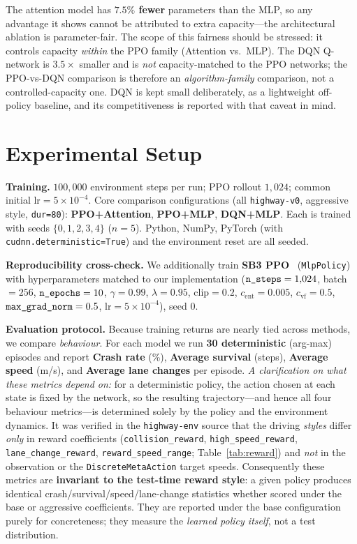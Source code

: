 \documentclass[conference]{IEEEtran}
\newcommand{\code}[1]{\texttt{#1}}
\begin{document}
The attention model has \textbf{$7.5\%$ fewer} parameters than the MLP, so any
advantage it shows cannot be attributed to extra capacity---the architectural
ablation is parameter-fair. The scope of this fairness should be stressed: it
controls capacity \emph{within} the PPO family (Attention vs.\ MLP). The DQN
Q-network is $3.5\times$ smaller and is \emph{not} capacity-matched to the PPO
networks; the PPO-vs-DQN comparison is therefore an \emph{algorithm-family}
comparison, not a controlled-capacity one. DQN is kept small deliberately, as a
lightweight off-policy baseline, and its competitiveness is reported with that
caveat in mind.

\section{Experimental Setup}
\label{sec:setup}
\textbf{Training.} $100{,}000$ environment steps per run; PPO rollout $1{,}024$;
common initial $\text{lr} = 5\times10^{-4}$. Core comparison configurations
(all \code{highway-v0}, aggressive style, \code{dur=80}):
\textbf{PPO+Attention}, \textbf{PPO+MLP}, \textbf{DQN+MLP}. Each is trained
with seeds $\{0, 1, 2, 3, 4\}$ ($n=5$). Python, NumPy, PyTorch (with
\code{cudnn.deterministic=True}) and the environment reset are all seeded.

\textbf{Reproducibility cross-check.} We additionally train \textbf{SB3
PPO}~\cite{sb3} (\code{MlpPolicy}) with hyperparameters matched to our
implementation ($\text{\code{n\_steps}}=1{,}024$, batch$=256$,
$\text{\code{n\_epochs}}=10$, $\gamma=0.99$, $\lambda=0.95$, clip$=0.2$,
$c_{\mathrm{ent}}=0.005$, $c_{\mathrm{vf}}=0.5$,
$\text{\code{max\_grad\_norm}}=0.5$, $\text{lr}=5\times10^{-4}$), seed 0.

\textbf{Evaluation protocol.} Because training returns are nearly tied across
methods, we compare \emph{behaviour}. For each model we run \textbf{30
deterministic} (arg-max) episodes and report \textbf{Crash rate} (\%),
\textbf{Average survival} (steps), \textbf{Average speed} (m/s), and
\textbf{Average lane changes} per episode. \emph{A clarification on what these
metrics depend on:} for a deterministic policy, the action chosen at each state
is fixed by the network, so the resulting trajectory---and hence all four
behaviour metrics---is determined solely by the policy and the environment
dynamics. It was verified in the \code{highway-env} source that the driving
\emph{styles} differ \emph{only} in reward coefficients
(\code{collision\_reward}, \code{high\_speed\_reward}, \code{lane\_change\_reward},
\code{reward\_speed\_range}; Table~\ref{tab:reward}) and \emph{not} in the
observation or the \code{DiscreteMetaAction} target speeds. Consequently these
metrics are \textbf{invariant to the test-time reward style}: a given policy
produces identical crash/survival/speed/lane-change statistics whether scored
under the base or aggressive coefficients. They are reported under the base
configuration purely for concreteness; they measure the \emph{learned policy
itself}, not a test distribution.
\end{document}
